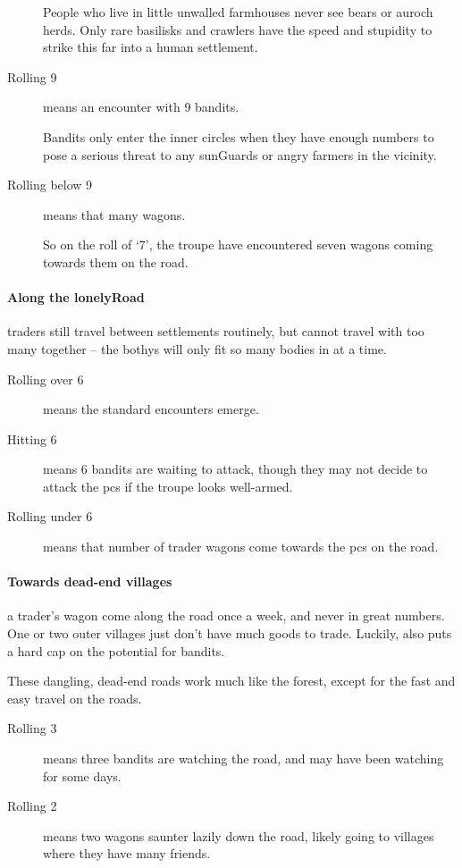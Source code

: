 \begin{multicols}{2}
\begin{description}
  People who live in little unwalled farmhouses never see bears or auroch herds.
  Only rare \glspl{basilisk} and \glspl{crawler} have the speed and stupidity to strike this far into a human settlement.
  \item[Rolling 9]
  means an encounter with 9 bandits.

  Bandits only enter the inner circles when they have enough numbers to pose a serious threat to any \glspl{sunGuard} or angry farmers in the vicinity.
  \item[Rolling below 9]
  means that many wagons.

  So on the roll of `7', the troupe have encountered seven wagons coming towards them on the road.
\end{description}

\paragraph{Along the \gls{lonelyRoad}}
traders still travel between settlements routinely, but cannot travel with too many together -- the \glspl{bothy} will only fit so many bodies in at a time.

\begin{description}
  \item[Rolling over 6] means the standard encounters emerge.
  \item[Hitting 6] means 6 bandits are waiting to attack, though they may not decide to attack the \glspl{pc} if the troupe looks well-armed.
  \item[Rolling under 6]
  means that number of trader wagons come towards the \glspl{pc}
  on the road.
\end{description}

\paragraph{Towards dead-end \glspl{village}}
a trader's wagon come along the road once a week, and never in great numbers.
One or two outer \glspl{village} just don't have much goods to trade.
Luckily, also puts a hard cap on the potential for bandits.

These dangling, dead-end roads work much like the forest, except for the fast and easy travel on the roads.

\begin{description}
  \item[Rolling 3]
  means three bandits are watching the road, and may have been watching for some days.
  \item[Rolling 2]
  means two wagons saunter lazily down the road, likely going to \glspl{village} where they have many friends.
\end{description}


\end{multicols}
